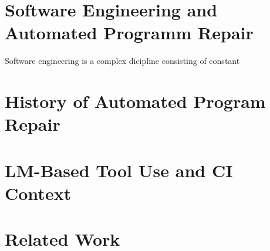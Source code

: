 \section{Software Engineering and Automated Programm Repair}
Software engineering is a complex dicipline consisting of constant 
\section{History of Automated Program Repair}

\section{LM-Based Tool Use and CI Context}

\section{Related Work}


